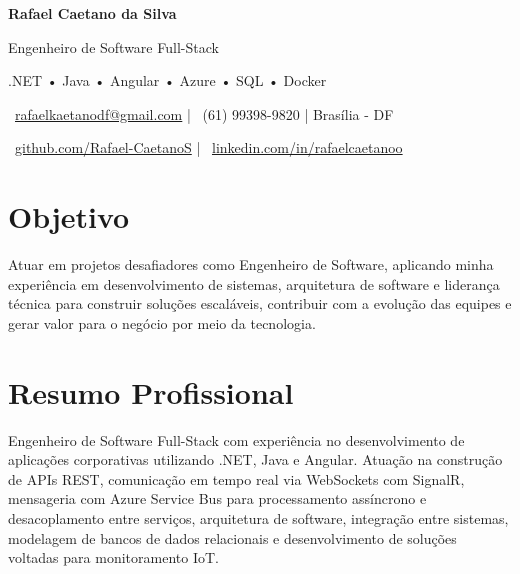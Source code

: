 \documentclass[11pt,a4paper]{article}
\begin{document}

\begin{center}

{\Huge\bfseries Rafael Caetano da Silva}

\vspace{5pt}

{\Large Engenheiro de Software Full-Stack}

\vspace{4pt}

{\small
.NET • Java • Angular • Azure • SQL • Docker
}

\vspace{6pt}

\small

\faEnvelope\
\href{mailto:rafaelkaetanodf@gmail.com}{rafaelkaetanodf@gmail.com}
\quad|\quad
\faPhone\
(61) 99398-9820
\quad|\quad
\faMapMarker*
Brasília - DF

\vspace{3pt}

\faGithub\
\href{https://github.com/Rafael-CaetanoS}{github.com/Rafael-CaetanoS}
\quad|\quad
\faLinkedin\
\href{https://linkedin.com/in/rafaelcaetanoo}{linkedin.com/in/rafaelcaetanoo}

\end{center}

\vspace{-0.2cm}
\section{Objetivo}

Atuar em projetos desafiadores como Engenheiro de Software, aplicando minha experiência em desenvolvimento de sistemas, arquitetura de software e liderança técnica para construir soluções escaláveis, contribuir com a evolução das equipes e gerar valor para o negócio por meio da tecnologia.

\section{Resumo Profissional}

Engenheiro de Software Full-Stack com experiência no desenvolvimento de aplicações corporativas utilizando .NET, Java e Angular. Atuação na construção de APIs REST, comunicação em tempo real via WebSockets com SignalR, mensageria com Azure Service Bus para processamento assíncrono e desacoplamento entre serviços, arquitetura de software, integração entre sistemas, modelagem de bancos de dados relacionais e desenvolvimento de soluções voltadas para monitoramento IoT.
\end{document}
